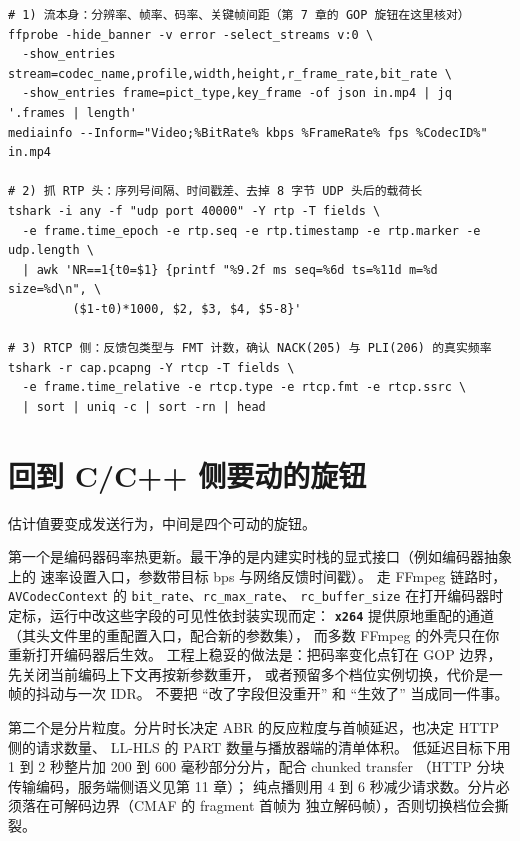 \documentclass[12pt,a4paper,fontset=fandol]{ctexbook}
\newcommand{\Tp}[1]{\texttt{#1}}
\newcommand{\Bk}{\discretionary{}{}{}}
\newcommand{\Lib}[1]{\textbf{\texttt{#1}}}
\begin{document}
\begin{lstlisting}[style=shellstyle,caption={读流、读分片与读 RTP 头：一条排障组合},label={lst:ch14-probe}]
# 1) 流本身：分辨率、帧率、码率、关键帧间距（第 7 章的 GOP 旋钮在这里核对）
ffprobe -hide_banner -v error -select_streams v:0 \
  -show_entries stream=codec_name,profile,width,height,r_frame_rate,bit_rate \
  -show_entries frame=pict_type,key_frame -of json in.mp4 | jq '.frames | length'
mediainfo --Inform="Video;%BitRate% kbps %FrameRate% fps %CodecID%" in.mp4

# 2) 抓 RTP 头：序列号间隔、时间戳差、去掉 8 字节 UDP 头后的载荷长
tshark -i any -f "udp port 40000" -Y rtp -T fields \
  -e frame.time_epoch -e rtp.seq -e rtp.timestamp -e rtp.marker -e udp.length \
  | awk 'NR==1{t0=$1} {printf "%9.2f ms seq=%6d ts=%11d m=%d size=%d\n", \
         ($1-t0)*1000, $2, $3, $4, $5-8}'

# 3) RTCP 侧：反馈包类型与 FMT 计数，确认 NACK(205) 与 PLI(206) 的真实频率
tshark -r cap.pcapng -Y rtcp -T fields \
  -e frame.time_relative -e rtcp.type -e rtcp.fmt -e rtcp.ssrc \
  | sort | uniq -c | sort -rn | head
\end{lstlisting}

\section{回到 C/C++ 侧要动的旋钮}

估计值要变成发送行为，中间是四个可动的旋钮。

第一个是编码器码率热更新。最干净的是内建实时栈的显式接口（例如编码器抽象上的
速率设置入口，参数带目标 bps 与网络反馈时间戳）。
走 FFmpeg 链路时，\Tp{AVCodecC{\Bk}ontext} 的 \Tp{bit\_{\Bk}rate}、\Tp{rc\_{\Bk}max\_{\Bk}rate}、
\Tp{rc\_{\Bk}buffer\_{\Bk}size} 在打开编码器时定标，运行中改这些字段的可见性依封装实现而定：
\Lib{x264} 提供原地重配的通道（其头文件里的重配置入口，配合新的参数集），
而多数 FFmpeg 的外壳只在你重新打开编码器后生效。
工程上稳妥的做法是：把码率变化点钉在 GOP 边界，先关闭当前编码上下文再按新参数重开，
或者预留多个档位实例切换，代价是一帧的抖动与一次 IDR。
不要把 ``改了字段但没重开'' 和 ``生效了'' 当成同一件事。

第二个是分片粒度。分片时长决定 ABR 的反应粒度与首帧延迟，也决定 HTTP 侧的请求数量、
LL-HLS 的 PART 数量与播放器端的清单体积。
低延迟目标下用 1 到 2 秒整片加 200 到 600 毫秒部分分片，配合 chunked transfer
（HTTP 分块传输编码，服务端侧语义见第 11 章）；
纯点播则用 4 到 6 秒减少请求数。分片必须落在可解码边界（CMAF 的 fragment 首帧为
独立解码帧），否则切换档位会撕裂。
\end{document}
